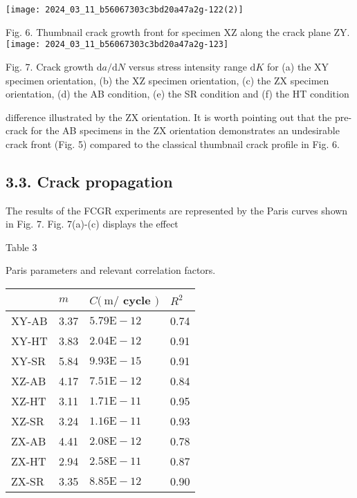 \documentclass[10pt]{article}
\begin{document}
\begin{center}
\texttt{[image: 2024\_03\_11\_b56067303c3bd20a47a2g-122(2)]}
\end{center}

Fig. 6. Thumbnail crack growth front for specimen $\mathrm{XZ}$ along the crack plane ZY.\\
\texttt{[image: 2024\_03\_11\_b56067303c3bd20a47a2g-123]}

Fig. 7. Crack growth $\mathrm{d} a / \mathrm{d} N$ versus stress intensity range $\mathrm{d} K$ for (a) the XY specimen orientation, (b) the XZ specimen orientation, (c) the ZX specimen orientation, (d) the AB condition, (e) the SR condition and (f) the HT condition

difference illustrated by the ZX orientation. It is worth pointing out that the pre-crack for the AB specimens in the ZX orientation demonstrates an undesirable crack front (Fig. 5) compared to the classical thumbnail crack profile in Fig. 6.

\subsection*{3.3. Crack propagation}
The results of the FCGR experiments are represented by the Paris curves shown in Fig. 7. Fig. 7(a)-(c) displays the effect

Table 3

Paris parameters and relevant correlation factors.

\begin{center}
\begin{tabular}{llll}
\hline
 & $m$ & $C(\mathrm{~m} /$ cycle $)$ & $R^{2}$ \\
\hline
XY-AB & 3.37 & $5.79 \mathrm{E}-12$ & 0.74 \\
XY-HT & 3.83 & $2.04 \mathrm{E}-12$ & 0.91 \\
XY-SR & 5.84 & $9.93 \mathrm{E}-15$ & 0.91 \\
XZ-AB & 4.17 & $7.51 \mathrm{E}-12$ & 0.84 \\
XZ-HT & 3.11 & $1.71 \mathrm{E}-11$ & 0.95 \\
XZ-SR & 3.24 & $1.16 \mathrm{E}-11$ & 0.93 \\
ZX-AB & 4.41 & $2.08 \mathrm{E}-12$ & 0.78 \\
ZX-HT & 2.94 & $2.58 \mathrm{E}-11$ & 0.87 \\
ZX-SR & 3.35 & $8.85 \mathrm{E}-12$ & 0.90 \\
\hline
\end{tabular}
\end{center}
\end{document}
